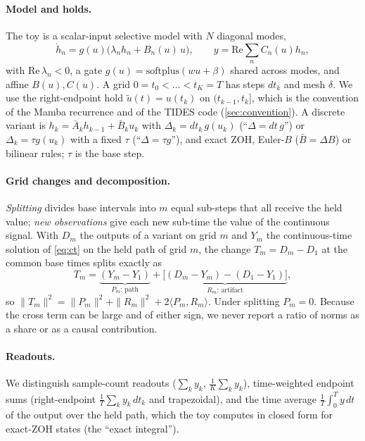 \documentclass{article}
\theoremstyle{plain}
\theoremstyle{definition}
\theoremstyle{remark}
\begin{document}
\paragraph{Model and holds.}
The toy is a scalar-input selective model with $N$ diagonal modes,
\begin{equation}
\dot h_n=g(u)\big(\lambda_n h_n+B_n(u)\,u\big),\qquad y=\mathrm{Re}\textstyle\sum_nC_n(u)h_n,
\label{eq:ct}
\end{equation}
with $\mathrm{Re}\,\lambda_n<0$, a gate $g(u)=\mathrm{softplus}(wu+\beta)$ shared across modes, and affine $B(u),C(u)$.
A grid $0=t_0<\dots<t_K=T$ has steps $dt_k$ and mesh $\delta$.
We use the right-endpoint hold $\tilde u(t)=u(t_k)$ on $(t_{k-1},t_k]$, which is the convention of the Mamba recurrence and of the TIDES code (\cref{sec:convention}).
A discrete variant is $h_k=\bar A_kh_{k-1}+\bar B_ku_k$ with $\Delta_k=dt_k\,g(u_k)$ (``$\Delta{=}dt\,g$'') or $\Delta_k=\tau g(u_k)$ with a fixed $\tau$ (``$\Delta{=}\tau g$''), and exact ZOH, Euler-$B$ ($\bar B=\Delta B$) or bilinear rules; $\tau$ is the base step.

\paragraph{Grid changes and decomposition.}
\emph{Splitting} divides base intervals into $m$ equal sub-steps that all receive the held value; \emph{new observations} give each new sub-time the value of the continuous signal.
With $D_m$ the outputs of a variant on grid $m$ and $Y_m$ the continuous-time solution of \eqref{eq:ct} on the held path of grid $m$, the change $T_m=D_m-D_1$ at the common base times splits exactly as
\begin{equation}
T_m=\underbrace{(Y_m-Y_1)}_{P_m\text{: path}}+\underbrace{\big[(D_m-Y_m)-(D_1-Y_1)\big]}_{R_m\text{: artifact}},
\label{eq:decomp}
\end{equation}
so $\|T_m\|^2=\|P_m\|^2+\|R_m\|^2+2\langle P_m,R_m\rangle$.
Under splitting $P_m=0$.
Because the cross term can be large and of either sign, we never report a ratio of norms as a share or as a causal contribution.

\paragraph{Readouts.}
We distinguish sample-count readouts ($\sum_ky_k$, $\frac1K\sum_ky_k$), time-weighted endpoint sums (right-endpoint $\frac1T\sum_ky_k\,dt_k$ and trapezoidal), and the time average $\frac1T\int_0^Ty\,dt$ of the output over the held path, which the toy computes in closed form for exact-ZOH states (the ``exact integral'').
\end{document}
